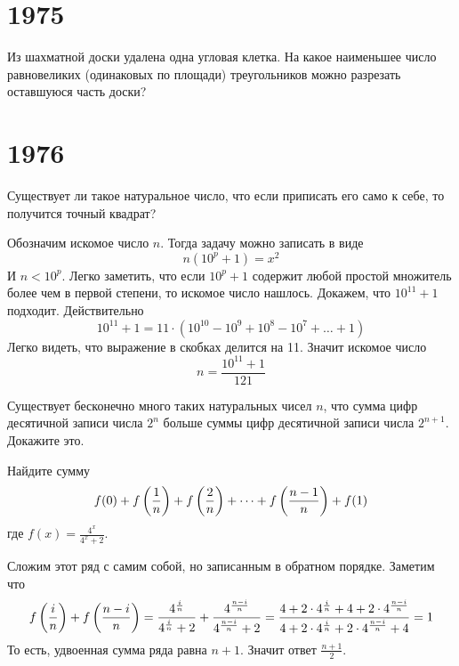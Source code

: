 \documentclass[11pt, a4paper]{template}
\begin{document}
\chapter{1975}

\begin{exercise}[M306]
Из шахматной доски удалена одна угловая клетка. На какое наименьшее число равновеликих (одинаковых по площади) треугольников можно разрезать оставшуюся часть доски?
\end{exercise}

\chapter{1976}

\begin{exercise}[M387]
Существует ли такое натуральное число, что если приписать его само к себе, то получится точный квадрат? 
\end{exercise}

\begin{solution}
Обозначим искомое число $n$. Тогда задачу можно записать в виде
$$
n(10^{p}+1) = x^{2}
$$
И $n < 10^{p}$. Легко заметить, что если $10^{p} + 1$ содержит любой простой множитель более чем в первой степени, то искомое число нашлось. Докажем, что $10^{11}+1$ подходит. Действительно
$$
10^{11}+1 = 11 \cdot (10^{10} - 10^{9} + 10^{8} - 10^{7} + \dots + 1)
$$
Легко видеть, что выражение в скобках делится на 11. Значит искомое число
$$
n = \frac{10^{11} + 1}{121}
$$ 
\end{solution}

\begin{exercise}[M390]
Существует бесконечно много таких натуральных чисел $n$, что сумма цифр десятичной записи числа $2^{n}$ больше суммы цифр десятичной записи числа $2^{n+1}$. Докажите это.
\end{exercise}

\begin{exercise}[M393]
Найдите сумму
$$
f(0) + f\left(\frac{1}{n}\right) + f\left(\frac{2}{n}\right) + \dots + f\left(\frac{n-1}{n}\right) + f(1) 
$$
где $f(x) = \frac{4^{x}}{4^{x}+2}$.
\end{exercise}

\begin{solution}
Сложим этот ряд с самим собой, но записанным в обратном порядке. Заметим что
$$
f\left(\frac{i}{n}\right) + f\left(\frac{n-i}{n}\right) = \frac{4^{\frac{i}{n}}}{4^{\frac{i}{n}}+2} + \frac{4^{\frac{n-i}{n}}}{4^{\frac{n-i}{n}}+2} = \frac{4 + 2 \cdot 4^{\frac{i}{n}} + 4 + 2 \cdot 4^{\frac{n-i}{n}}}{4 + 2 \cdot 4^{\frac{i}{n}} + 2 \cdot 4^{\frac{n-i}{n}} + 4} = 1
$$
То есть, удвоенная сумма ряда равна $n + 1$. Значит ответ $\frac{n+1}{2}$.
\end{solution}
\end{document}
